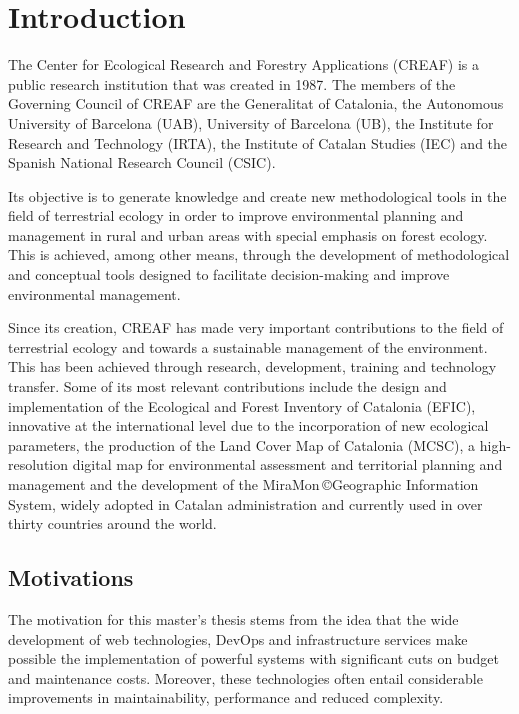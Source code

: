 
\chapter{Introduction}

The Center for Ecological Research and Forestry Applications (CREAF) is a public research institution that was created in 1987.  The members of the Governing Council of CREAF are the Generalitat of Catalonia, the Autonomous University of Barcelona (UAB), University of Barcelona (UB), the Institute for Research and Technology (IRTA), the Institute of Catalan Studies (IEC) and the Spanish National Research Council (CSIC).

Its objective is to generate knowledge and create new methodological tools in the field of terrestrial ecology in order to improve environmental planning and management in rural and urban areas with special emphasis on forest ecology. This is achieved, among other means, through the development of methodological and conceptual tools designed to facilitate decision-making and improve environmental management.

Since its creation, CREAF has made very important contributions to the field of terrestrial ecology and towards a sustainable management of the environment. This has been achieved through research, development, training and technology transfer. Some of its most relevant contributions include the design and implementation of the Ecological and Forest Inventory of Catalonia (EFIC), innovative at the international level due to the incorporation of new ecological parameters, the production of the Land Cover Map of Catalonia (MCSC), a high-resolution digital map for environmental assessment and territorial planning and management and the development of the MiraMon \copyright  Geographic Information System, widely adopted in Catalan administration and currently used in over thirty countries around the world.


\section{Motivations}

The motivation for this master's thesis stems from the idea that the wide development of web technologies, DevOps and infrastructure services make possible the implementation of powerful systems with significant cuts on budget and maintenance costs. Moreover, these technologies often entail considerable improvements in maintainability, performance and reduced complexity.

